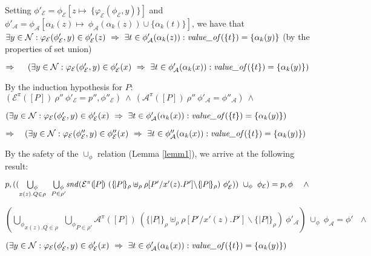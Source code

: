 \documentclass[10pt,a4paper,final,oneside,fleqn]{book}
\begin{document}
\noindent
Setting $\phi'_\mathcal{E}=\phi_\mathcal{E}[z\mapsto~\{\varphi_\mathcal{E}(\phi_\mathcal{E},y)\}]$ and $\phi'_\mathcal{A}=\phi_\mathcal{A}[\alpha_k(z)\mapsto~\phi_\mathcal{A}(\alpha_k(z))\cup\{\alpha_k(t)\}]$, we have that $\exists y\in\mathcal{N}:\varphi_\mathcal{E}(\phi'_\mathcal{E},y)\in\phi'_\mathcal{E}(z)~\Rightarrow~\exists t\in\phi'_\mathcal{A}(\alpha_k(z)):\mbox{{\itshape value\_of\/}}(\{t\})=\{\alpha_k(y)\}$ (by the properties of set union)\vspace{5mm}

\noindent
$\Rightarrow~~~~(\exists y\in\mathcal{N}:\varphi_\mathcal{E}(\phi'_\mathcal{E},y)\in\phi'_\mathcal{E}(x)~\Rightarrow~\exists t\in\phi'_\mathcal{A}(\alpha_k(x)):\mbox{{\itshape value\_of\/}}(\{t\})=\{\alpha_k(y)\})$\vspace{5mm}

\noindent
By the induction hypothesis for $P$:\vspace{5mm}
$(\mathcal{E}^\pi(\![P]\!)~\rho''~\phi'_{\mathcal{E}}=p'',\phi''_\mathcal{E})~\wedge~(\mathcal{A}^\pi(\![P]\!)~\rho''~\phi'_{\mathcal{A}}=\phi''_\mathcal{A})~\wedge$

\noindent
$(\exists y\in\mathcal{N}:\varphi_\mathcal{E}(\phi'_\mathcal{E},y)\in\phi'_\mathcal{E}(x)~\Rightarrow~\exists t\in\phi'_\mathcal{A}(\alpha_k(x)):\mbox{{\itshape value\_of\/}}(\{t\})=\{\alpha_k(y)\})$\vspace{5mm}

\noindent
$\Rightarrow~~~(\exists y\in\mathcal{N}:\varphi_\mathcal{E}(\phi''_\mathcal{E},y)\in\phi''_\mathcal{E}(x)~\Rightarrow~\exists t\in\phi''_\mathcal{A}(\alpha_k(x)):\mbox{{\itshape value\_of\/}}(\{t\})=\{\alpha_k(y)\})$\vspace{5mm}

\noindent
By the safety of the $\cup_\phi$ relation (Lemma \ref{lemm1}), we arrive at the following result:

\noindent
$p,((\underset{x(z).Q\in\rho}{\bigcup_\phi}~~\underset{P\in\rho'}{\bigcup_\phi}\mbox{{\itshape snd\/}}(\mathcal{E}^\pi(\![P]\!)~(\{\!|P|\!\}_\rho\uplus_\rho\rho[P'/x'(z).P']\backslash\{\!|P|\!\}_\rho)~\phi'_{\mathcal{E}}))~\cup_\phi~\phi_\mathcal{E})=p,\phi~~~~\wedge$

\noindent
$(\underset{x(z).Q\in\rho}{\bigcup_\phi}~~\underset{P\in\rho'}{\bigcup_\phi}\mathcal{A}^\pi(\![P]\!)~(\{\!|P|\!\}_\rho\uplus_\rho\rho[P'/x'(z).P']\backslash\{\!|P|\!\}_\rho)~\phi'_{\mathcal{A}})~\cup_\phi~\phi_\mathcal{A}=\phi'~~~\wedge$

\noindent
$(\exists y\in\mathcal{N}:\varphi_\mathcal{E}(\phi'_\mathcal{E},y)\in\phi'_\mathcal{E}(x)~\Rightarrow~\exists t\in\phi'_\mathcal{A}(\alpha_k(x)):\mbox{{\itshape value\_of\/}}(\{t\})=\{\alpha_k(y)\})$\vspace{5mm}
\end{document}
